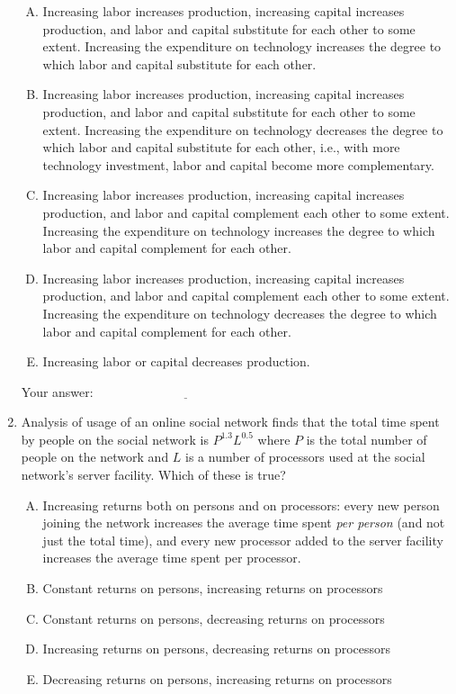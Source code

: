 \documentclass[10pt]{amsart}
\begin{document}
\begin{enumerate}
  \begin{enumerate}[(A)]
  \item Increasing labor increases production, increasing capital
    increases production, and labor and capital substitute for each
    other to some extent. Increasing the expenditure on technology
    increases the degree to which labor and capital substitute for
    each other.
  \item Increasing labor increases production, increasing capital
    increases production, and labor and capital substitute for each
    other to some extent. Increasing the expenditure on technology
    decreases the degree to which labor and capital substitute for
    each other, i.e., with more technology investment, labor and
    capital become more complementary.
  \item Increasing labor increases production, increasing capital
    increases production, and labor and capital complement each other
    to some extent. Increasing the expenditure on technology increases
    the degree to which labor and capital complement for each other.
  \item Increasing labor increases production, increasing capital
    increases production, and labor and capital complement each other
    to some extent. Increasing the expenditure on technology decreases
    the degree to which labor and capital complement for each other.
  \item Increasing labor or capital decreases production.
  \end{enumerate}

  \vspace{0.05in}
  Your answer: $\underline{\qquad\qquad\qquad\qquad\qquad\qquad\qquad}$
  \vspace{0.05in}

\item Analysis of usage of an online social network finds that the
  total time spent by people on the social network is $P^{1.3}L^{0.5}$
  where $P$ is the total number of people on the network and $L$ is a
  number of processors used at the social network's server
  facility. Which of these is true?

  \begin{enumerate}[(A)]
  \item Increasing returns both on persons and on processors: every
    new person joining the network increases the average time spent
    {\em per person} (and not just the total time), and every new
    processor added to the server facility increases the average time
    spent per processor.
  \item Constant returns on persons, increasing returns on processors
  \item Constant returns on persons, decreasing returns on processors
  \item Increasing returns on persons, decreasing returns on processors
  \item Decreasing returns on persons, increasing returns on processors
  \end{enumerate}


\end{enumerate}
\end{document}
